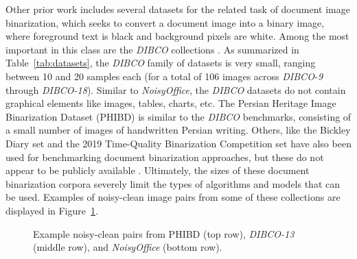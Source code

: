 \documentclass[runningheads]{llncs}
\begin{document}
Other prior work includes several datasets for the related task of document image binarization, which seeks to convert a document image into a binary image, where foreground text is black and background pixels are white.
Among the most important in this class are the \emph{DIBCO} collections \cite{dibco-09,dibco-10,dibco-11,dibco-12,dibco-13,dibco-14,dibco-16,dibco-17,dibco-18}.
As summarized in Table~\ref{tab:datasets}, the \emph{DIBCO} family of datasets is very small, ranging between 10 and 20 samples each (for a total of 106 images across \emph{DIBCO-9} through \emph{DIBCO-18}).
Similar to \emph{NoisyOffice}, the \emph{DIBCO} datasets do not contain graphical elements like images, tables, charts, etc.
The Persian Heritage Image Binarization Dataset (PHIBD) \cite{phibc-2012-nafchi,nafchi-2013-icdar} is similar to the \emph{DIBCO} benchmarks, consisting of a small number of images of handwritten Persian writing.
Others, like the Bickley Diary set \cite{bickley-diary} and the 2019 Time-Quality Binarization Competition set \cite{2019-time-quality-competition} have also been used for benchmarking document binarization approaches, but these do not appear to be publicly available \cite{tensmeyer-binarization-review-2020}.
Ultimately, the sizes of these document binarization corpora severely limit the types of algorithms and models that can be used.
Examples of noisy-clean image pairs from some of these collections are displayed in Figure~\ref{fig:other-dataset-examples}.

\begin{figure}
    \centering{}
    \caption{Example noisy-clean pairs from PHIBD (top row), \emph{DIBCO-13} (middle row), and \emph{NoisyOffice} (bottom row).}
    \label{fig:other-dataset-examples}
\end{figure}
\end{document}

